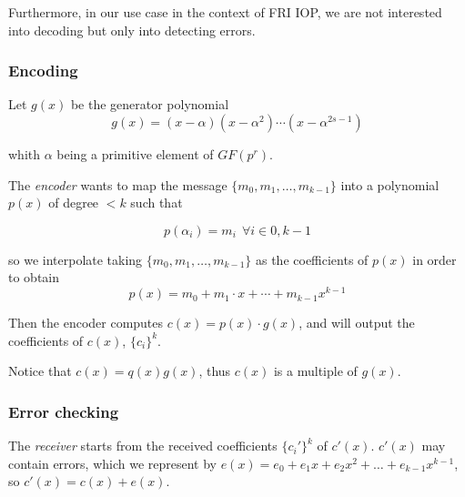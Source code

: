 \documentclass[a4paper]{article}
\theoremstyle{definition}
\begin{document}
Furthermore, in our use case in the context of FRI IOP, we are not interested into decoding but only into detecting errors.

% 
% 
% 
% 
% 

% 


\subsubsection{Encoding}

Let $g(x)$ be the generator polynomial
$$g(x) = (x-\alpha) (x-\alpha^2) \cdots (x-\alpha^{2s-1})$$

whith $\alpha$ being a primitive element of $GF(p^r)$.

The \emph{encoder} wants to map the message $\{ m_0, m_1, \ldots, m_{k-1} \}$ into a polynomial $p(x)$ of degree $<k$ such that

$$p(\alpha_i) = m_i ~~ \forall i\in{0, k-1}$$

so we interpolate taking $\{ m_0, m_1, \ldots, m_{k-1} \}$ as the coefficients of $p(x)$ in order to obtain
$$p(x) = m_0 + m_1 \cdot x + \cdots + m_{k-1} x^{k-1}$$

Then the encoder computes $c(x) = p(x) \cdot g(x)$, and will output the coefficients of $c(x)$, $\{ c_i \}^k$.

Notice that $c(x)=q(x)g(x)$, thus $c(x)$ is a multiple of $g(x)$.

\subsubsection{Error checking}

The \emph{receiver} starts from the received coefficients $\{c_i'\}^k$ of $c'(x)$. $c'(x)$ may contain errors, which we represent by $e(x) = e_0 + e_1 x + e_2 x^2 + \ldots + e_{k-1} x^{k-1}$, so $c'(x) = c(x) + e(x)$.
\end{document}
